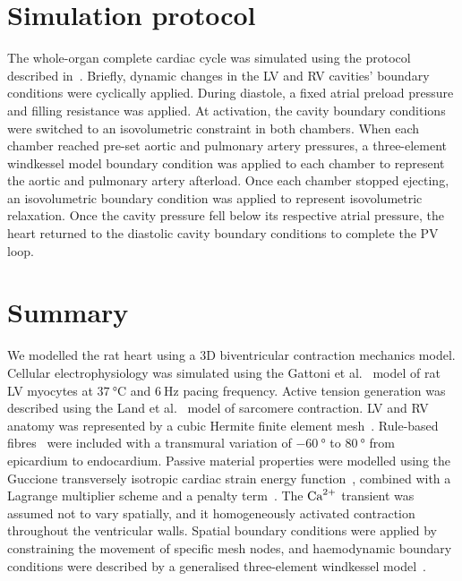%
%
%
\section{Simulation protocol}\label{sec:ch2simulationprotocol}
The whole-organ complete cardiac cycle was simulated using the protocol described in~\cite{Land:2012, Land:2012*a, Land:2015}. Briefly, dynamic changes in the LV and RV cavities' boundary conditions were cyclically applied. During diastole, a fixed atrial preload pressure and filling resistance was applied. At activation, the cavity boundary conditions were switched to an isovolumetric constraint in both chambers. When each chamber reached pre-set aortic and pulmonary artery pressures, a three-element windkessel model boundary condition was applied to each chamber to represent the aortic and pulmonary artery afterload. Once each chamber stopped ejecting, an isovolumetric boundary condition was applied to represent isovolumetric relaxation. Once the cavity pressure fell below its respective atrial pressure, the heart returned to the diastolic cavity boundary conditions to complete the PV loop.


%
%
%
\section{Summary}\label{sec:ch2summary}
We modelled the rat heart using a $3$D biventricular contraction mechanics model. Cellular electrophysiology was simulated using the Gattoni et al.~\cite{Gattoni:2016} model of rat LV myocytes at $\SI{37}{\celsius}$ and $\SI{6}{\hertz}$ pacing frequency. Active tension generation was described using the Land et al.~\cite{Land:2012*a} model of sarcomere contraction. LV and RV anatomy was represented by a cubic Hermite finite element mesh~\cite{Lamata:2011}. Rule-based fibres~\cite{Bayer:2012} were included with a transmural variation of $\SI{-60}{\degree}$ to $\SI{80}{\degree}$ from epicardium to endocardium. Passive material properties were modelled using the Guccione transversely isotropic cardiac strain energy function~\cite{Guccione:1991}, combined with a Lagrange multiplier scheme and a penalty term~\cite{Land:2012*a, Land:2015*b}. The $\textrm{Ca}^{2+}$ transient was assumed not to vary spatially, and it homogeneously activated contraction throughout the ventricular walls. Spatial boundary conditions were applied by constraining the movement of specific mesh nodes, and haemodynamic boundary conditions were described by a generalised three-element windkessel model~\cite{Westerhof:1991}.